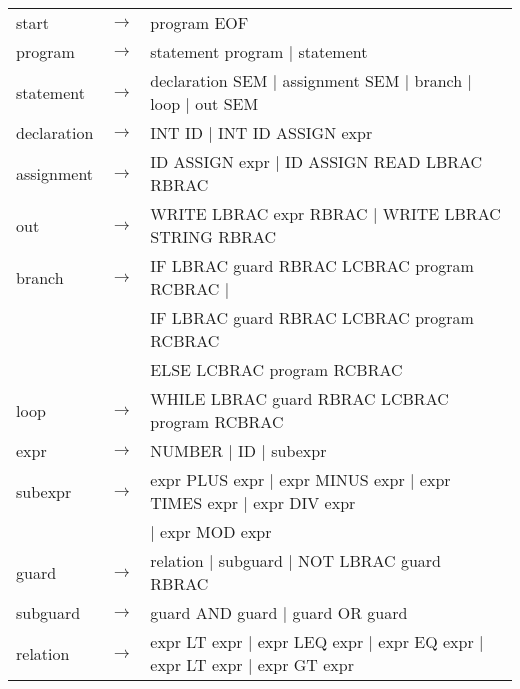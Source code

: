 \begin{solution}
\begin{center}
	\begin{tabular}{lll}
		start       &$\to$ & program EOF\\
		program     &$\to$ & statement program $\mid$ statement\\
		statement   &$\to$ & declaration SEM $\mid$ assignment SEM $\mid$ branch $\mid$ loop $\mid$ out SEM\\
		declaration &$\to$ & INT ID $\mid$ INT ID ASSIGN expr\\
		assignment  &$\to$ & ID ASSIGN expr $\mid$ ID ASSIGN READ LBRAC RBRAC\\
		out         &$\to$ & WRITE LBRAC expr RBRAC $\mid$ WRITE LBRAC STRING RBRAC\\
		branch      &$\to$ & IF LBRAC guard RBRAC LCBRAC program RCBRAC $\mid$\\
		&      & IF LBRAC guard RBRAC LCBRAC program RCBRAC\\
		&      & ELSE LCBRAC program RCBRAC\\
		loop        &$\to$ & WHILE LBRAC guard RBRAC LCBRAC program RCBRAC\\
		expr        &$\to$ & NUMBER $\mid$ ID $\mid$ subexpr\\
		subexpr     &$\to$ & expr PLUS expr $\mid$ expr MINUS expr $\mid$ expr TIMES expr $\mid$ expr DIV expr\\
		&      & $\mid$ expr MOD expr\\
		guard       &$\to$ & relation $\mid$ subguard $\mid$ NOT LBRAC guard RBRAC\\
		subguard    &$\to$ & guard AND guard $\mid$ guard OR guard\\
		relation    &$\to$ & expr LT expr $\mid$ expr LEQ expr $\mid$ expr EQ expr $\mid$ expr LT expr $\mid$ expr GT expr
	\end{tabular}
\end{center}
\end{solution}
